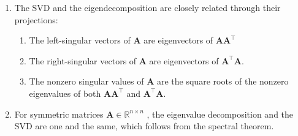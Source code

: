 \begin{enumerate}
    \item The SVD and the eigendecomposition are closely related through their projections:
    \hfill \cite{mfml/book/mml/Deisenroth-Faisal-Ong}
    \begin{enumerate}
        \item The left-singular vectors of $\bm{A}$ are eigenvectors of $\bm{AA}^\top$
        \hfill \cite{mfml/book/mml/Deisenroth-Faisal-Ong}

        \item The right-singular vectors of $\bm{A}$ are eigenvectors of $\bm{A}^\top \bm{A}$.
        \hfill \cite{mfml/book/mml/Deisenroth-Faisal-Ong}

        \item The nonzero singular values of $\bm{A}$ are the square roots of the nonzero eigenvalues of both $\bm{AA}^\top$ and $\bm{A} ^\top \bm{A}$.
        \hfill \cite{mfml/book/mml/Deisenroth-Faisal-Ong}
    \end{enumerate}

    \item For symmetric matrices $\bm{A} \in \mathbb{R}^{n\times n}$ , the eigenvalue decomposition and the SVD are one and the same, which follows from the spectral theorem.
    \hfill \cite{mfml/book/mml/Deisenroth-Faisal-Ong}
\end{enumerate}











